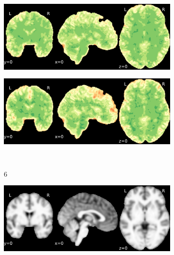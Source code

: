 \documentclass{article}
\begin{document}
\begin{landscape}
\begin{figure}
\begin{subfigure}[t]{0.2\paperheight}
        \end{subfigure}
        \begin{subfigure}[t]{0.2\paperheight}
            \centering
            \includegraphics[width=\textwidth]{figures/sig/fwhm_5/rs_ds001748_sub-adult15_sig.pdf}
        \end{subfigure}
        \begin{subfigure}[t]{0.2\paperheight}
            \centering
            \includegraphics[width=\textwidth]{figures/sig/fwhm_5/rr.rs_ds001748_sub-adult15_sig.pdf}
        \end{subfigure} \\
        \begin{subfigure}[b][][c]{0.01\paperwidth} 6 \vspace*{15pt} \end{subfigure}
        \begin{subfigure}[t]{0.2\paperheight}
            \centering
            \includegraphics[width=\textwidth]{figures/ieee_T1/fwhm_5/ieee_ds001748_sub-adult16.pdf}

\end{subfigure}
\end{figure}
\end{landscape}
\end{document}
